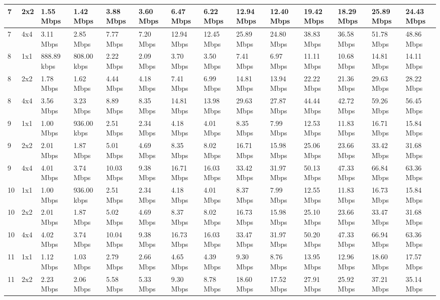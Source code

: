 \documentclass[12pt]{article}
\begin{document}
\begin{longtable}[c]{|l|l|l|l|l|l|l|l|l|l|l|l|l|l|}
7 & 2x2 & 1.55 Mbps & 1.42 Mbps & 3.88 Mbps & 3.60 Mbps & 6.47 Mbps & 6.22 Mbps & 12.94 Mbps & 12.40 Mbps & 19.42 Mbps & 18.29 Mbps & 25.89 Mbps & 24.43 Mbps \\ \hline
7 & 4x4 & 3.11 Mbps & 2.85 Mbps & 7.77 Mbps & 7.20 Mbps & 12.94 Mbps & 12.45 Mbps & 25.89 Mbps & 24.80 Mbps & 38.83 Mbps & 36.58 Mbps & 51.78 Mbps & 48.86 Mbps \\ \hline
8 & 1x1 & 888.89 kbps & 808.00 kbps & 2.22 Mbps & 2.09 Mbps & 3.70 Mbps & 3.50 Mbps & 7.41 Mbps & 6.97 Mbps & 11.11 Mbps & 10.68 Mbps & 14.81 Mbps & 14.11 Mbps \\ \hline
8 & 2x2 & 1.78 Mbps & 1.62 Mbps & 4.44 Mbps & 4.18 Mbps & 7.41 Mbps & 6.99 Mbps & 14.81 Mbps & 13.94 Mbps & 22.22 Mbps & 21.36 Mbps & 29.63 Mbps & 28.22 Mbps \\ \hline
8 & 4x4 & 3.56 Mbps & 3.23 Mbps & 8.89 Mbps & 8.35 Mbps & 14.81 Mbps & 13.98 Mbps & 29.63 Mbps & 27.87 Mbps & 44.44 Mbps & 42.72 Mbps & 59.26 Mbps & 56.45 Mbps \\ \hline
9 & 1x1 & 1.00 Mbps & 936.00 kbps & 2.51 Mbps & 2.34 Mbps & 4.18 Mbps & 4.01 Mbps & 8.35 Mbps & 7.99 Mbps & 12.53 Mbps & 11.83 Mbps & 16.71 Mbps & 15.84 Mbps \\ \hline
9 & 2x2 & 2.01 Mbps & 1.87 Mbps & 5.01 Mbps & 4.69 Mbps & 8.35 Mbps & 8.02 Mbps & 16.71 Mbps & 15.98 Mbps & 25.06 Mbps & 23.66 Mbps & 33.42 Mbps & 31.68 Mbps \\ \hline
9 & 4x4 & 4.01 Mbps & 3.74 Mbps & 10.03 Mbps & 9.38 Mbps & 16.71 Mbps & 16.03 Mbps & 33.42 Mbps & 31.97 Mbps & 50.13 Mbps & 47.33 Mbps & 66.84 Mbps & 63.36 Mbps \\ \hline
10 & 1x1 & 1.00 Mbps & 936.00 kbps & 2.51 Mbps & 2.34 Mbps & 4.18 Mbps & 4.01 Mbps & 8.37 Mbps & 7.99 Mbps & 12.55 Mbps & 11.83 Mbps & 16.73 Mbps & 15.84 Mbps \\ \hline
10 & 2x2 & 2.01 Mbps & 1.87 Mbps & 5.02 Mbps & 4.69 Mbps & 8.37 Mbps & 8.02 Mbps & 16.73 Mbps & 15.98 Mbps & 25.10 Mbps & 23.66 Mbps & 33.47 Mbps & 31.68 Mbps \\ \hline
10 & 4x4 & 4.02 Mbps & 3.74 Mbps & 10.04 Mbps & 9.38 Mbps & 16.73 Mbps & 16.03 Mbps & 33.47 Mbps & 31.97 Mbps & 50.20 Mbps & 47.33 Mbps & 66.94 Mbps & 63.36 Mbps \\ \hline
11 & 1x1 & 1.12 Mbps & 1.03 Mbps & 2.79 Mbps & 2.66 Mbps & 4.65 Mbps & 4.39 Mbps & 9.30 Mbps & 8.76 Mbps & 13.95 Mbps & 12.96 Mbps & 18.60 Mbps & 17.57 Mbps \\ \hline
11 & 2x2 & 2.23 Mbps & 2.06 Mbps & 5.58 Mbps & 5.33 Mbps & 9.30 Mbps & 8.78 Mbps & 18.60 Mbps & 17.52 Mbps & 27.91 Mbps & 25.92 Mbps & 37.21 Mbps & 35.14 Mbps \\ \hline

\end{longtable}
\end{document}
